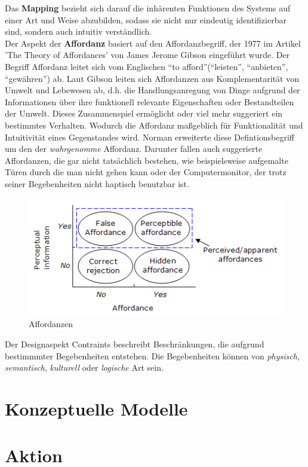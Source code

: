 \documentclass[parskip,headsepline, headtopline, %
footsepline, oneside, 12pt, headings=small]{scrreprt}
\begin{document}
Das	\textbf{Mapping} bezieht sich darauf die inhärenten Funktionen des Systems auf einer Art und Weise abzubilden, sodass sie nicht nur eindeutig identifizierbar sind, sondern auch intuitiv verständlich.\\

Der Aspekt der \textbf{Affordanz} basiert auf den Affordanzbegriff, der 1977 im Artikel 'The Theory of Affordances' von James Jerome Gibson eingeführt wurde. Der Begriff Affordanz leitet sich vom Englischen “to afford”(“leisten”, “anbieten”, “gewähren”) ab. Laut Gibson leiten sich Affordanzen aus Komplementarität von Umwelt und Lebewesen ab, d.h.  
die Handlungsanregung von Dinge aufgrund der Informationen über ihre funktionell relevante Eigenschaften oder Bestandteilen der Umwelt. Dieses Zusammenspiel ermöglicht oder viel mehr suggeriert ein bestimmtes Verhalten. Wodurch die Affordanz maßgeblich für Funktionalität und Intuitivität eines Gegenstandes wird.
Norman erweiterte diese Defintionsbegriff um den der \textit{wahrgenomme} Affordanz. Darunter fallen auch suggerierte Affordanzen, die gar nicht tatsächlich bestehen, wie beispielsweise aufgemalte Türen durch die man nicht gehen kann oder der Computermonitor, der trotz seiner Begebenheiten nicht haptisch benutzbar ist. 

\begin{figure}
\includegraphics{images/figure2_affordances.png}
\caption{Affordanzen}
\label{fig:action}
\end{figure}

Der Designaspekt Contraints beschreibt Beschränkungen, die aufgrund bestimmmter Begebenheiten entstehen. Die Begebenheiten können von \textit{physisch}, \textit{semantisch}, \textit{kulturell} oder \textit{logische} Art sein.

\section{Konzeptuelle Modelle}


\section{Aktion}
\end{document}
